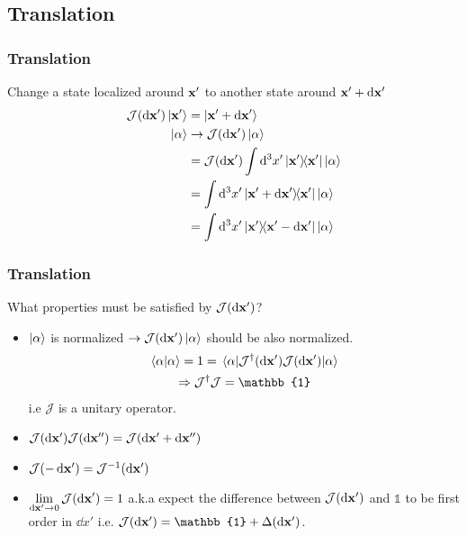 \subsection{Translation}
\begin{frame}
	\frametitle{Translation}

	Change a state localized around $\vb{x'}$ to another state around $\vb{x'} + \dd{\vb{x'}}$
	\\
	\begin{align*}
		\mathcal{J}(\dd{\vb x'}) \ket{\vb x'} & = \ket{\vb x' + \dd{\vb x'}}                                       \\
		\ket{\alpha}                          & \to \mathcal{J}(\dd{\vb x'})\ket{\alpha}                           \\
		                                      & = \mathcal{J}(\dd{\vb x'}) \int \dd[3]{x'} \op{\vb x'}\ket{\alpha} \\
		                                      & = \int \dd[3]{x'} \op{\vb x' + \dd{\vb x'}}{\vb x'} \ket \alpha    \\
		                                      & = \int \dd[3]{x'} \op{\vb x'}{\vb x' - \dd{\vb x'}} \ket \alpha
	\end{align*}


\end{frame}

\begin{frame}
	\frametitle{Translation}
	What properties must be satisfied by $\mathcal{J}(\dd{\vb x'})$?
	\begin{itemize}
		\item $\ket{\alpha}$ is normalized $\to \mathcal{J}(\dd{\vb x'}) \ket \alpha$ should be also normalized.
		      \begin{gather*}
			      \ip{\alpha} = 1 = \ev{\mathcal{J}^\dag (\dd{\vb x'}) \mathcal{J}(\dd{\vb x'})}{\alpha}\\
			      \Rightarrow \mathcal{J}^\dag \mathcal J= \mathbb{1}
		      \end{gather*}
		      i.e $\mathcal{J}$ is a unitary operator.

		\item $\mathcal{J}(\dd{\vb x'})\mathcal{J}(\dd{\vb x''}) = \mathcal{J}(\dd{\vb x'} + \dd{\vb x''})$
		\item $ \mathcal{J}(-\dd{\vb x'}) = \mathcal{J}^{-1}(\dd{\vb x'})$
		\item $ \displaystyle \lim_{\dd{\vb x'} \to 0} \mathcal{J}(\dd{\vb x'}) = 1$ a.k.a expect the difference between $\mathcal{J}(\dd{\vb x'})$ and $\mathbb 1$ to be first order in $\dd{x'}$ i.e. $\mathcal{J}(\dd{\vb x'}) = \mathbb{1} + \Delta(\dd{\vb x'})$.
	\end{itemize}

\end{frame}

